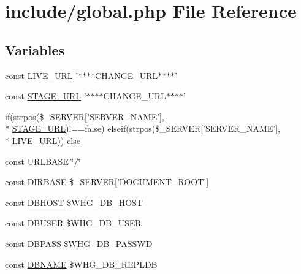 \hypertarget{global_8php}{\section{include/global.php File Reference}
\label{global_8php}
}
\subsection*{Variables}
\begin{DoxyCompactItemize}
\item 
const \hyperlink{global_8php_ade7436eeb9a94e391a9d15a8a6865dd9}{L\-I\-V\-E\-\_\-\-U\-R\-L} '$\ast$$\ast$$\ast$$\ast$C\-H\-A\-N\-G\-E\-\_\-\-U\-R\-L$\ast$$\ast$$\ast$$\ast$'
\item 
const \hyperlink{global_8php_a9de38c82260effe90ef1caa4d6026973}{S\-T\-A\-G\-E\-\_\-\-U\-R\-L} '$\ast$$\ast$$\ast$$\ast$C\-H\-A\-N\-G\-E\-\_\-\-U\-R\-L$\ast$$\ast$$\ast$$\ast$'
\item 
if(strpos(\$\-\_\-\-S\-E\-R\-V\-E\-R\mbox{[}'S\-E\-R\-V\-E\-R\-\_\-\-N\-A\-M\-E'\mbox{]}, \\*
\hyperlink{global_8php_a9de38c82260effe90ef1caa4d6026973}{S\-T\-A\-G\-E\-\_\-\-U\-R\-L})!==false) elseif(strpos(\$\-\_\-\-S\-E\-R\-V\-E\-R\mbox{[}'S\-E\-R\-V\-E\-R\-\_\-\-N\-A\-M\-E'\mbox{]}, \\*
\hyperlink{global_8php_ade7436eeb9a94e391a9d15a8a6865dd9}{L\-I\-V\-E\-\_\-\-U\-R\-L})) \hyperlink{global_8php_a44a5a7f896e2444d9c7b91deffff3b49}{else}
\item 
const \hyperlink{global_8php_a422353d788747ecd47fc7a656e4ebd92}{U\-R\-L\-B\-A\-S\-E} \char`\"{}/\char`\"{}
\item 
const \hyperlink{global_8php_a504552fd43e46a0032aa3f2895349f22}{D\-I\-R\-B\-A\-S\-E} \$\-\_\-\-S\-E\-R\-V\-E\-R\mbox{[}'D\-O\-C\-U\-M\-E\-N\-T\-\_\-\-R\-O\-O\-T'\mbox{]}
\item 
const \hyperlink{global_8php_a40edb9274f7711736cc3ee12d2e5ddba}{D\-B\-H\-O\-S\-T} \$W\-H\-G\-\_\-\-D\-B\-\_\-\-H\-O\-S\-T
\item 
const \hyperlink{global_8php_a221f39b0b526c043e3a1ade2dd56a70e}{D\-B\-U\-S\-E\-R} \$W\-H\-G\-\_\-\-D\-B\-\_\-\-U\-S\-E\-R
\item 
const \hyperlink{global_8php_add7bef9fbed1ad1fa386dcb65fd5d813}{D\-B\-P\-A\-S\-S} \$W\-H\-G\-\_\-\-D\-B\-\_\-\-P\-A\-S\-S\-W\-D
\item 
const \hyperlink{global_8php_af7d219badcc93cc3a13a604c769542bc}{D\-B\-N\-A\-M\-E} \$W\-H\-G\-\_\-\-D\-B\-\_\-\-R\-E\-P\-L\-D\-B

\end{DoxyCompactItemize}
